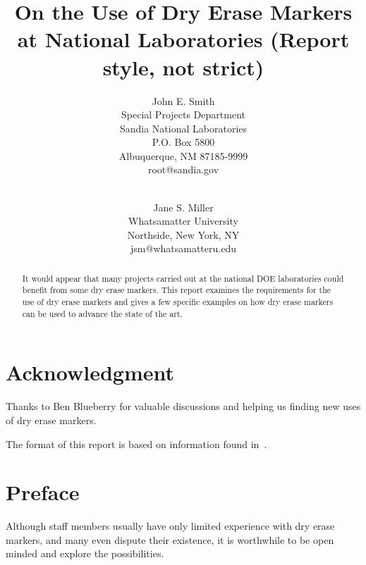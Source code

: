 \documentclass[pdf,ps2pdf,12pt,report,OUO]{SANDreport}
\title{On the Use of Dry Erase Markers at National Laboratories (Report style, not strict)}
\author{John E. Smith \\
  Special Projects Department \\
  Sandia National Laboratories\\
  P.O. Box 5800\\
  Albuquerque, NM 87185-9999 \\
  root@sandia.gov \\
  \\
  \and
  Jane S. Miller \\
  Whatsamatter University \\
  Northside, New York, NY\\
  jsm@whatsamatteru.edu
}
\date{}
\begin{document}
\maketitle

% 
\begin{abstract}
  It would appear that many projects carried out at the
  national DOE laboratories could benefit from some dry erase markers. This
  report examines the requirements for the use of dry erase markers and
  gives a few specific examples on how dry erase markers can be used to
  advance the state of the art.
\end{abstract}


% 
\clearpage
\chapter*{Acknowledgment}
Thanks to Ben Blueberry for valuable discussions and helping
us finding new uses of dry erase markers.

The format of this report is based on information found
in~\cite{Sand98-0730}.


% 
\cleardoublepage		%
\tableofcontents
\listoffigures
\listoftables


\clearpage
\chapter*{Preface}
Although staff members usually have only limited experience with
dry erase markers, and many even dispute their existence, it is worthwhile
to be open minded and explore the possibilities.
\end{document}
